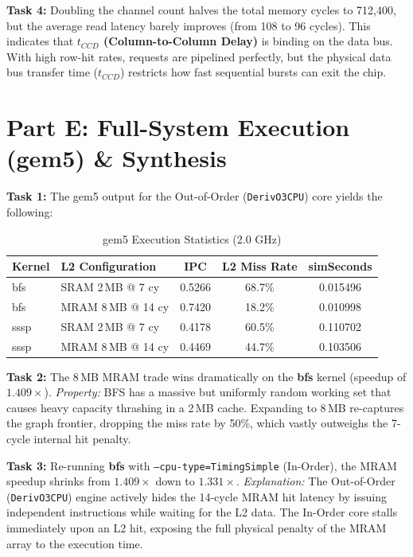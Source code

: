 \documentclass[11pt,a4paper]{article}
\begin{document}
\textbf{Task 4:} Doubling the channel count halves the total memory cycles to 712,400, but the average read latency barely improves (from 108 to 96 cycles). This indicates that \textbf{$t_{CCD}$ (Column-to-Column Delay)} is binding on the data bus. With high row-hit rates, requests are pipelined perfectly, but the physical data bus transfer time ($t_{CCD}$) restricts how fast sequential bursts can exit the chip.

\section{Part E: Full-System Execution (gem5) \& Synthesis}
\textbf{Task 1:} The gem5 output for the Out-of-Order (\texttt{DerivO3CPU}) core yields the following:
\begin{table}[H]
\centering
\caption{gem5 Execution Statistics (2.0 GHz)}
\label{tab:gem5}
\begin{tabular}{@{}llccc@{}}
\toprule
\textbf{Kernel} & \textbf{L2 Configuration} & \textbf{IPC} & \textbf{L2 Miss Rate} & \textbf{simSeconds} \\ \midrule
bfs & SRAM 2\,MB @ 7 cy & 0.5266 & 68.7\% & 0.015496 \\
bfs & MRAM 8\,MB @ 14 cy & 0.7420 & 18.2\% & 0.010998 \\
sssp & SRAM 2\,MB @ 7 cy & 0.4178 & 60.5\% & 0.110702 \\
sssp & MRAM 8\,MB @ 14 cy & 0.4469 & 44.7\% & 0.103506 \\ \bottomrule
\end{tabular}
\end{table}

\textbf{Task 2:} The 8\,MB MRAM trade wins dramatically on the \textbf{bfs} kernel (speedup of $1.409\times$). 
\textit{Property:} BFS has a massive but uniformly random working set that causes heavy capacity thrashing in a 2\,MB cache. Expanding to 8\,MB re-captures the graph frontier, dropping the miss rate by 50\%, which vastly outweighs the 7-cycle internal hit penalty.

\textbf{Task 3:} Re-running \textbf{bfs} with \texttt{--cpu-type=TimingSimple} (In-Order), the MRAM speedup shrinks from $1.409\times$ down to $1.331\times$. 
\textit{Explanation:} The Out-of-Order (\texttt{DerivO3CPU}) engine actively hides the 14-cycle MRAM hit latency by issuing independent instructions while waiting for the L2 data. The In-Order core stalls immediately upon an L2 hit, exposing the full physical penalty of the MRAM array to the execution time.
\end{document}
